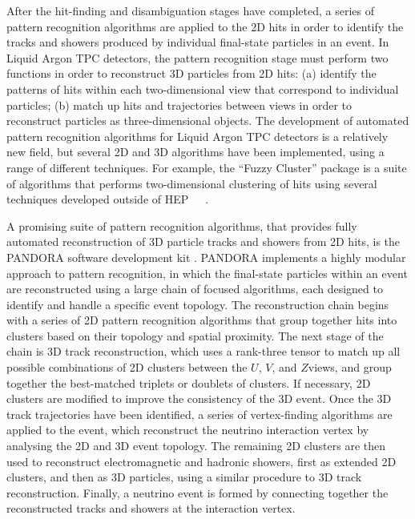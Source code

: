 After the hit-finding and disambiguation stages have completed, a series of 
pattern recognition algorithms are applied to the 2D hits in order to identify 
the tracks and showers produced by individual final-state particles in an event.
In Liquid Argon TPC detectors, the pattern recognition stage must perform 
two functions in order to reconstruct 3D particles from 2D hits:
(a) identify the patterns of hits within each two-dimensional view
that correspond to individual particles; (b) match up hits and trajectories
between views in order to reconstruct particles as three-dimensional objects.
The development of automated pattern recognition algorithms for Liquid Argon 
TPC detectors is a relatively new field, but several 2D and 3D algorithms
have been implemented, using a range of different techniques.
For example, the ``Fuzzy Cluster'' package is a suite of algorithms that
performs two-dimensional clustering of hits using several techniques developed 
outside of HEP~\cite{flame}~\cite{ppht}~\cite{dbscan}.

A promising suite of pattern recognition algorithms, that provides fully 
automated reconstruction of 3D particle tracks and showers from 2D hits, 
is the PANDORA software development kit .
PANDORA implements a highly modular approach to pattern recognition,
in which the final-state particles within an event are reconstructed using 
a large chain of focused algorithms, each designed to identify and handle
a specific event topology. The reconstruction chain begins with a 
series of 2D pattern recognition algorithms that group together hits 
into clusters based on their topology and spatial proximity.
The next stage of the chain is 3D track reconstruction, 
which uses a rank-three tensor to match up all possible combinations 
of 2D clusters between the $U$, $V$, and $Z$views, and group together 
the best-matched triplets or doublets of clusters. If necessary, 
2D clusters are modified to improve the consistency of the 3D event. 
Once the 3D track trajectories have been identified, 
a series of vertex-finding algorithms are applied to the event,
which reconstruct the neutrino interaction vertex by analysing 
the 2D and 3D event topology. The remaining 2D clusters are then
used to reconstruct electromagnetic and hadronic showers,
first as extended 2D clusters, and then as 3D particles, 
using a similar procedure to 3D track reconstruction.
Finally, a neutrino event is formed by connecting together the 
reconstructed tracks and showers at the interaction vertex.

